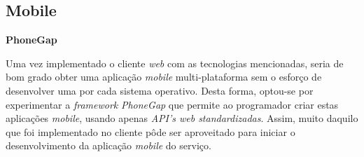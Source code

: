 \subsection{Mobile} 

	\textbf{\large{PhoneGap}}\\
	\label{ssub:phonegap}
	
	Uma vez implementado o cliente \emph{web} com as tecnologias mencionadas, seria de bom grado obter uma aplicação \emph{mobile} multi-plataforma sem o esforço de desenvolver uma por cada sistema operativo. Desta forma, optou-se por experimentar a \emph{framework} \emph{PhoneGap} que permite ao programador criar estas aplicações \emph{mobile}, usando apenas \emph{API's web standardizadas}. Assim, muito daquilo que foi implementado no cliente pôde ser aproveitado para iniciar o desenvolvimento da aplicação \emph{mobile} do serviço.